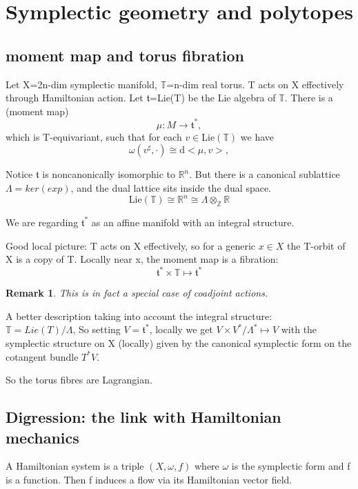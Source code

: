 \documentclass[a4paper]{article}
\newtheorem{rmk}[thm]{Remark}
\newcommand{\R}{\mathbb{R}}
\newcommand{\LieT}{\mathfrak{t}}
\newcommand{\T}{\mathbb{T}}
\begin{document}
	\section{Symplectic geometry and polytopes}
	
	\subsection{moment map and torus fibration}
	Let  X=2n-dim symplectic manifold, $\T$=n-dim real torus.
	T acts on X effectively through Hamiltonian action.  Let $\LieT$=Lie(T) be the Lie algebra of $\T$. There is a (moment map) $$\mu\colon M\to \LieT^\ast,$$ which is T-equivariant, such that for each $v\in\mathrm{Lie}(\mathbb{T})$ we have $$\omega(v^\sharp,\cdot)\cong \mathrm{d}<\mu,v>,$$ 
	
	Notice $\LieT$ is noncanonically isomorphic to $\R^{n}$.
	But there is a canonical sublattice $\Lambda=ker (exp)$, and the dual lattice sits inside the dual space.
	$$\mathrm{Lie}(\mathbb{T})\cong \mathbb{R}^n\cong \Lambda\otimes_{\mathbb{Z}}\mathbb{R}$$
	
	We are regarding $\LieT^{*}$ as an affine manifold with an integral structure.
	
	Good local picture:
	T acts on X effectively, so for a generic $x \in X$ the T-orbit of X is a copy of T. Locally near x, the moment map is a fibration:
	$$\LieT^* \times \T \mapsto \LieT^*$$
	
	\begin{rmk}
		This is in fact a special case of coadjoint actions.
	\end{rmk}
	A better description taking into account the integral structure: \\
	
	$\T=Lie(T)/\Lambda$, 
	So setting $V=\LieT^{*}$, locally we get $V \times V^{*}/{\Lambda}^{*} \mapsto V$  
	with the symplectic structure on X (locally) given by the canonical symplectic form on the cotangent bundle  $T^{*}V$.
	
	
	
	So the torus fibres are Lagrangian.
	
	\subsection{Digression: the link with Hamiltonian mechanics}
	
	A Hamiltonian system is a triple $ (X, \omega, f)$ where $\omega$ is the symplectic form and f is a function. Then f induces a flow via its Hamiltonian vector field.\\
	
\end{document}

